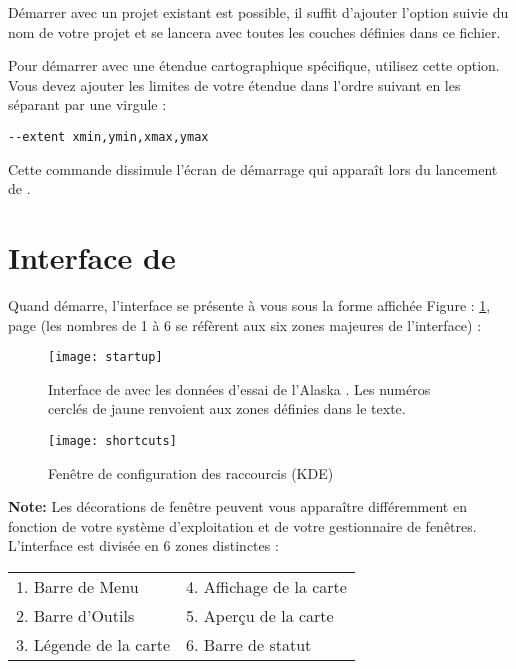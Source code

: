 Démarrer \qg avec un projet existant est possible, il suffit d'ajouter l'option  suivie du nom de votre projet et \qg se lancera avec toutes les couches définies dans ce fichier.

Pour démarrer avec une étendue cartographique spécifique, utilisez cette option. Vous devez ajouter les limites de votre étendue dans l'ordre suivant en les séparant par une virgule :
\begin{verbatim}
--extent xmin,ymin,xmax,ymax
\end{verbatim}

Cette commande dissimule l'écran de démarrage qui apparaît lors du lancement de \qg.

\section{Interface de \qg} 
\label{label_qgismainwindow}

Quand \qg démarre, l'interface se présente à vous sous la forme affichée Figure : \ref{fig:startup}, page \pageref{fig:startup} (les nombres de 1 à 6 se réfèrent aux six zones majeures de l'interface) :

\begin{figure}[ht]
   \centering
   \texttt{[image: startup]}
   \caption{Interface de \qg avec les données d'essai de l'Alaska \nixcaption. Les numéros cerclés de jaune renvoient aux zones définies dans le texte.} \label{fig:startup}
\end{figure}

\begin{figure}[ht]
   \centering
   \texttt{[image: shortcuts]}
   \caption{Fenêtre de configuration des raccourcis \nixcaption (KDE)} \label{fig:shortcuts}
\end{figure}

\textbf{Note:} Les décorations de fenêtre peuvent vous apparaître différemment en fonction de votre système d'exploitation et de votre gestionnaire de fenêtres. \\

L'interface est divisée en 6 zones distinctes :
\begin{center}
\begin{tabular}{p{5cm} p{5cm}}
1. Barre de Menu &4. Affichage de la carte\\
2. Barre d'Outils &5. Aperçu de la carte  \\
3. Légende de la carte &6. Barre de statut \\  
\end{tabular}
\end{center}

